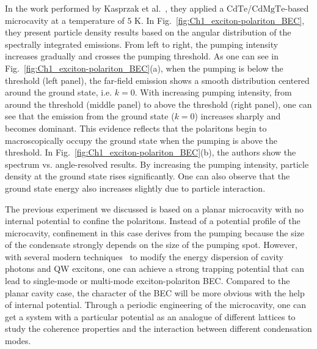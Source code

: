 In the work performed by Kasprzak et al.~\cite{Kasprzak:2006aa}, they applied a $\mathrm{CdTe}$/$\mathrm{CdMgTe}$-based microcavity at a temperature of $5$ K.
In Fig.~\ref{fig:Ch1_exciton-polariton_BEC}, they present particle density results based on the angular distribution of the spectrally integrated emissions.
From left to right, the pumping intensity increases gradually and crosses the pumping threshold.
As one can see in Fig.~\ref{fig:Ch1_exciton-polariton_BEC}(a), when the pumping is below the threshold (left panel), the far-field emission shows a smooth distribution centered around the ground state, i.e. $k=0$.
With increasing pumping intensity, from around the threshold (middle panel) to above the threshold (right panel), one can see that the emission from the ground state ($k=0$) increases sharply and becomes dominant.
This evidence reflects that the polaritons begin to macroscopically occupy the ground state when the pumping is above the threshold.
In Fig.~\ref{fig:Ch1_exciton-polariton_BEC}(b), the authors show the spectrum vs. angle-resolved results.
By increasing the pumping intensity, particle density at the ground state rises significantly.
One can also observe that the ground state energy also increases slightly due to particle interaction.

The previous experiment we discussed is based on a planar microcavity with no internal potential to confine the polaritons.
Instead of a potential profile of the microcavity, confinement in this case derives from the pumping because the size of the condensate strongly depends on the size of the pumping spot. However, with several modern techniques~\cite{Schneider:2017dq,Lai:2007aa,Cerda-Mendez:2010aa,Balili:2006aa} to modify the energy dispersion of cavity photons and QW excitons, one can achieve a strong trapping potential that can lead to single-mode or multi-mode exciton-polariton BEC.
Compared to the planar cavity case, the character of the BEC will be more obvious with the help of internal potential.
Through a periodic engineering of the microcavity, one can get a system with a particular potential as an analogue of different lattices to study the coherence properties and the interaction between different condensation modes.

